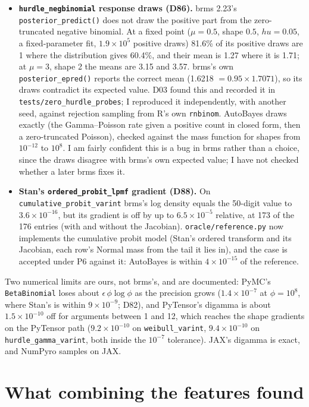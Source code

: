 \documentclass[11pt]{article}
\newcommand{\code}[1]{\texttt{#1}}
\newcommand{\file}[1]{\texttt{#1}}
\begin{document}
\begin{itemize}
\item \textbf{\code{hurdle\_negbinomial} response draws (D86).} brms 2.23's \code{posterior\_predict()} does not draw the
  positive part from the zero-truncated negative binomial. At a fixed point ($\mu = 0.5$, shape $0.5$, $\mathit{hu} = 0.05$,
  a fixed-parameter fit, $1.9\times10^{5}$ positive draws) 81.6\% of its positive draws are 1 where the distribution gives
  60.4\%, and their mean is 1.27 where it is 1.71; at $\mu = 3$, shape 2 the means are 3.15 and 3.57. brms's own
  \code{posterior\_epred()} reports the correct mean (1.6218 $= 0.95 \times 1.7071$), so its draws contradict its expected
  value. D03 found this and recorded it in \file{tests/zero\_hurdle\_probes}; I reproduced it independently, with another
  seed, against rejection sampling from R's own \code{rnbinom}. AutoBayes draws exactly (the Gamma--Poisson rate given a
  positive count in closed form, then a zero-truncated Poisson), checked against the mass function for shapes from
  $10^{-12}$ to $10^{8}$. I am fairly confident this is a bug in brms rather than a choice, since the draws disagree with
  brms's own expected value; I have not checked whether a later brms fixes it.
\item \textbf{Stan's \code{ordered\_probit\_lpmf} gradient (D88).} On \code{cumulative\_probit\_varint} brms's log density
  equals the 50-digit value to $3.6\times10^{-16}$, but its gradient is off by up to $6.5\times10^{-5}$ relative, at 173 of
  the 176 entries (with and without the Jacobian). \code{oracle/reference.py} now implements the cumulative probit model
  (Stan's ordered transform and its Jacobian, each row's Normal mass from the tail it lies in), and the case is accepted
  under P6 against it: AutoBayes is within $4\times10^{-15}$ of the reference.
\end{itemize}

\noindent Two numerical limits are ours, not brms's, and are documented: PyMC's \code{BetaBinomial} loses about
$\epsilon\,\phi\log\phi$ as the precision grows ($1.4\times10^{-7}$ at $\phi = 10^{8}$, where Stan's is within
$9\times10^{-9}$; D82), and PyTensor's digamma is about $1.5\times10^{-10}$ off for arguments between 1 and 12, which
reaches the shape gradients on the PyTensor path ($9.2\times10^{-10}$ on \code{weibull\_varint}, $9.4\times10^{-10}$ on
\code{hurdle\_gamma\_varint}, both inside the $10^{-7}$ tolerance). JAX's digamma is exact, and NumPyro samples on JAX.

\section{What combining the features found}
\label{sec:integration}
\end{document}
